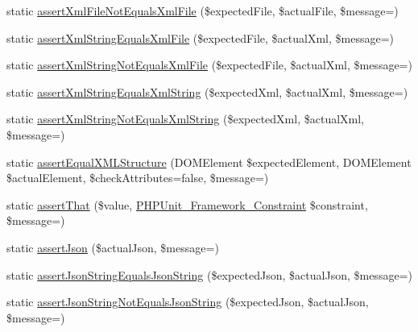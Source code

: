 \begin{DoxyCompactItemize}
\item 
static \mbox{\hyperlink{class_p_h_p_unit___framework___assert_ab4a25c68a28767f05dac66fb07984911}{assert\+Xml\+File\+Not\+Equals\+Xml\+File}} (\$expected\+File, \$actual\+File, \$message=\textquotesingle{}\textquotesingle{})
\item 
static \mbox{\hyperlink{class_p_h_p_unit___framework___assert_a4510b2a0c3325b6c27e2335456ff78b3}{assert\+Xml\+String\+Equals\+Xml\+File}} (\$expected\+File, \$actual\+Xml, \$message=\textquotesingle{}\textquotesingle{})
\item 
static \mbox{\hyperlink{class_p_h_p_unit___framework___assert_aebc6e4f7bf650fb0dfa233c75ed35dbc}{assert\+Xml\+String\+Not\+Equals\+Xml\+File}} (\$expected\+File, \$actual\+Xml, \$message=\textquotesingle{}\textquotesingle{})
\item 
static \mbox{\hyperlink{class_p_h_p_unit___framework___assert_a469f51447fe191931b9050ea14c361c7}{assert\+Xml\+String\+Equals\+Xml\+String}} (\$expected\+Xml, \$actual\+Xml, \$message=\textquotesingle{}\textquotesingle{})
\item 
static \mbox{\hyperlink{class_p_h_p_unit___framework___assert_a51dfd875a20c4b0cddc1a8490f6af1a8}{assert\+Xml\+String\+Not\+Equals\+Xml\+String}} (\$expected\+Xml, \$actual\+Xml, \$message=\textquotesingle{}\textquotesingle{})
\item 
static \mbox{\hyperlink{class_p_h_p_unit___framework___assert_a65f823c0e752ef960d34be72868aa334}{assert\+Equal\+X\+M\+L\+Structure}} (D\+O\+M\+Element \$expected\+Element, D\+O\+M\+Element \$actual\+Element, \$check\+Attributes=false, \$message=\textquotesingle{}\textquotesingle{})
\item 
static \mbox{\hyperlink{class_p_h_p_unit___framework___assert_af832e3d4fa7bfef798daf314769b2374}{assert\+That}} (\$value, \mbox{\hyperlink{class_p_h_p_unit___framework___constraint}{P\+H\+P\+Unit\+\_\+\+Framework\+\_\+\+Constraint}} \$constraint, \$message=\textquotesingle{}\textquotesingle{})
\item 
static \mbox{\hyperlink{class_p_h_p_unit___framework___assert_a3766f5a5195c53605375cfa9a74148ca}{assert\+Json}} (\$actual\+Json, \$message=\textquotesingle{}\textquotesingle{})
\item 
static \mbox{\hyperlink{class_p_h_p_unit___framework___assert_a4bdba9ffebc615f25e11b8cc808b25c3}{assert\+Json\+String\+Equals\+Json\+String}} (\$expected\+Json, \$actual\+Json, \$message=\textquotesingle{}\textquotesingle{})
\item 
static \mbox{\hyperlink{class_p_h_p_unit___framework___assert_a12ed15e396e1bb876715765538532e9e}{assert\+Json\+String\+Not\+Equals\+Json\+String}} (\$expected\+Json, \$actual\+Json, \$message=\textquotesingle{}\textquotesingle{})

\end{DoxyCompactItemize}
